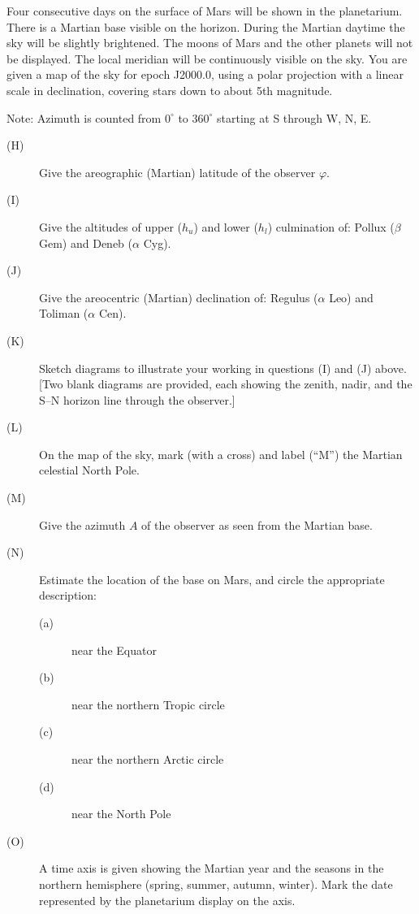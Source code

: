 Four consecutive days on the surface of Mars will be shown in the
planetarium. There is a Martian base visible on the horizon. During the
Martian daytime the sky will be slightly brightened. The moons of Mars and
the other planets will not be displayed. The local meridian will be
continuously visible on the sky. You are given a map of the sky for epoch
J2000.0, using a polar projection with a linear scale in declination,
covering stars down to about 5th magnitude.

Note: Azimuth is counted from $0^\circ$ to $360^\circ$ starting at S through
W, N, E.

\begin{description}
\item[(H)] Give the areographic (Martian) latitude of the observer
  $\varphi$.
\item[(I)] Give the altitudes of upper ($h_u$) and lower ($h_l$) culmination
  of:
  Pollux ($\beta$ Gem) and Deneb ($\alpha$ Cyg).
\item[(J)] Give the areocentric (Martian) declination of:
  Regulus ($\alpha$ Leo) and Toliman ($\alpha$ Cen).
\item[(K)] Sketch diagrams to illustrate your working in questions (I) and
  (J) above.
  [Two blank diagrams are provided, each showing the zenith, nadir, and the
  S--N horizon line through the observer.]
\item[(L)] On the map of the sky, mark (with a cross) and label (``M'') the
  Martian celestial North Pole.
\item[(M)] Give the azimuth $A$ of the observer as seen from the Martian
  base.
\item[(N)] Estimate the location of the base on Mars, and circle the
  appropriate description:
  \begin{description}
  \item[(a)] near the Equator
  \item[(b)] near the northern Tropic circle
  \item[(c)] near the northern Arctic circle
  \item[(d)] near the North Pole
  \end{description}
\item[(O)] A time axis is given showing the Martian year and the seasons in
  the northern hemisphere (spring, summer, autumn, winter). Mark the date
  represented by the planetarium display on the axis.
\end{description}

